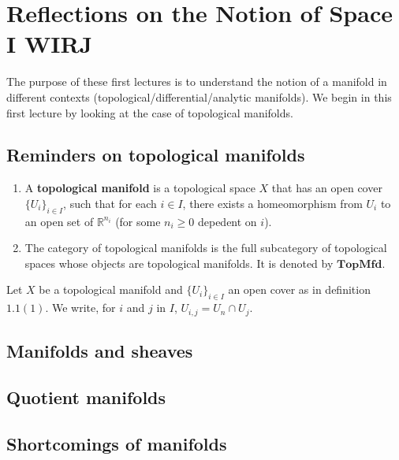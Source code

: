 \documentclass[../main.tex]{subfiles}
\begin{document}
\setcounter{chapter}{0}
\chapter{Reflections on the Notion of Space I WIRJ}

The purpose of these first lectures is to understand the notion of a manifold in different contexts (topological/differential/analytic manifolds). We begin in this first lecture by looking at the case of topological manifolds.

\section{Reminders on topological manifolds}

\begin{defn}


\begin{enumerate}
    \item A \textbf{topological manifold} is a topological space $X$ that has an open cover $\{U_i\}_{i \in I}$, such that for each $i \in I$, there exists a homeomorphism from $U_i$ to an open set of $\mathbb R^{n_i}$ (for some $n_i\ge 0$ depedent on $i$).
    \item The category of topological manifolds is the full subcategory of topological spaces whose objects are topological manifolds. It is denoted by $\mathbf{TopMfd}$.
\end{enumerate}

\end{defn}

Let $X$ be a topological manifold and $\{U_i\}_{i \in I}$ an open cover as in definition $1.1 (1)$. We write, for $i$ and $j$ in $I$, $U_{i,j} = U_n \cap U_j$.

\section{Manifolds and sheaves}

\section{Quotient manifolds}

\section{Shortcomings of manifolds}
\end{document}
